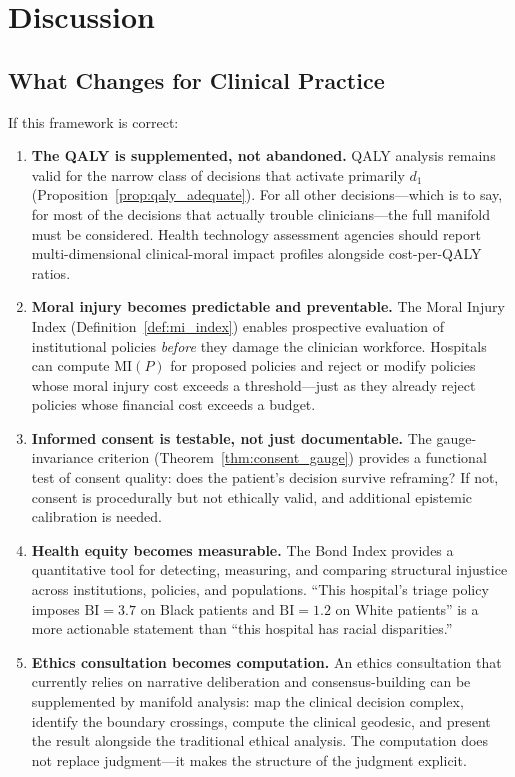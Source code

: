 \documentclass[12pt]{article}
\theoremstyle{definition}
\theoremstyle{remark}
\newcommand{\BI}{\mathrm{BI}}              %
\newcommand{\MI}{\mathrm{MI}}              %
\begin{document}
\section{Discussion}
\label{sec:discussion}

\subsection{What Changes for Clinical Practice}

If this framework is correct:

\begin{enumerate}
    \item \textbf{The QALY is supplemented, not abandoned.}  QALY analysis remains valid for the narrow class of decisions that activate primarily $d_1$ (Proposition~\ref{prop:qaly_adequate}).  For all other decisions---which is to say, for most of the decisions that actually trouble clinicians---the full manifold must be considered.  Health technology assessment agencies should report multi-dimensional clinical-moral impact profiles alongside cost-per-QALY ratios.

    \item \textbf{Moral injury becomes predictable and preventable.}  The Moral Injury Index (Definition~\ref{def:mi_index}) enables prospective evaluation of institutional policies \emph{before} they damage the clinician workforce.  Hospitals can compute $\MI(P)$ for proposed policies and reject or modify policies whose moral injury cost exceeds a threshold---just as they already reject policies whose financial cost exceeds a budget.

    \item \textbf{Informed consent is testable, not just documentable.}  The gauge-invariance criterion (Theorem~\ref{thm:consent_gauge}) provides a functional test of consent quality: does the patient's decision survive reframing?  If not, consent is procedurally but not ethically valid, and additional epistemic calibration is needed.

    \item \textbf{Health equity becomes measurable.}  The Bond Index provides a quantitative tool for detecting, measuring, and comparing structural injustice across institutions, policies, and populations.  ``This hospital's triage policy imposes $\BI = 3.7$ on Black patients and $\BI = 1.2$ on White patients'' is a more actionable statement than ``this hospital has racial disparities.''

    \item \textbf{Ethics consultation becomes computation.}  An ethics consultation that currently relies on narrative deliberation and consensus-building can be supplemented by manifold analysis: map the clinical decision complex, identify the boundary crossings, compute the clinical geodesic, and present the result alongside the traditional ethical analysis.  The computation does not replace judgment---it makes the structure of the judgment explicit.
\end{enumerate}
\end{document}
